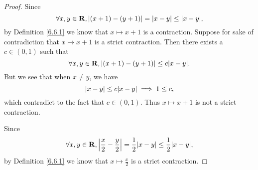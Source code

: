 \begin{proof}
    Since
    \[
        \forall x, y \in \mathbf{R}, \abs*{(x + 1) - (y + 1)} = \abs*{x - y} \leq \abs*{x - y},
    \]
    by Definition \ref{6.6.1} we know that \(x \mapsto x + 1\) is a contraction.
    Suppose for sake of contradiction that \(x \mapsto x + 1\) is a strict contraction.
    Then there exists a \(c \in (0, 1)\) such that
    \[
        \forall x, y \in \mathbf{R}, \abs*{(x + 1) - (y + 1)} \leq c \abs*{x - y}.
    \]
    But we see that when \(x \neq y\), we have
    \[
        \abs*{x - y} \leq c \abs*{x - y} \implies 1 \leq c,
    \]
    which contradict to the fact that \(c \in (0, 1)\).
    Thus \(x \mapsto x + 1\) is not a strict contraction.

    Since
    \[
        \forall x, y \in \mathbf{R}, \abs*{\frac{x}{2} - \frac{y}{2}} = \frac{1}{2} \abs*{x - y} \leq \frac{1}{2} \abs*{x - y},
    \]
    by Definition \ref{6.6.1} we know that \(x \mapsto \frac{x}{2}\) is a strict contraction.


\end{proof}
